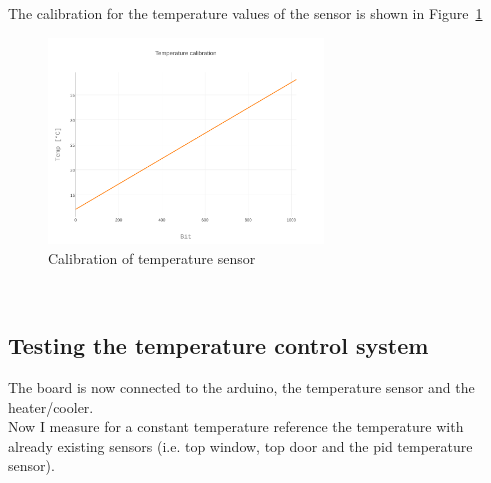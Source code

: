 \documentclass[12pt]{scrartcl}
\begin{document}
      \noindent The calibration for the temperature values of the sensor is shown in
      Figure~\ref{fig10}
      \begin{figure}[h]
        \centering
        \includegraphics[width = 0.65\textwidth]{./plots/plot_image(4)}
        \caption{Calibration of temperature sensor}
        \label{fig10}
      \end{figure}
      \\
    \subsection{Testing the temperature control system}
      The board is now connected to the arduino, the temperature sensor and the
      heater/cooler. \\
      Now I measure for a constant temperature reference the temperature with
      already existing sensors (i.e. top window, top door and the pid temperature
      sensor).
\end{document}
